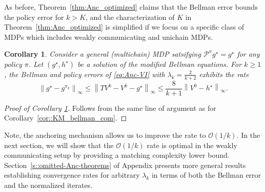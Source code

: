 \documentclass{article} %
\newcommand{\cP}{\mathcal{P}}
\newcommand*{\infn}[1]{\left\|{#1}\right\|_{\infty}}
\newtheorem{corollary}{Corollary}
\begin{document}
As before, Theorem~\ref{thm:Anc_optimized} claims that the Bellman error bounds the policy error for $k>K$, and the characterization of $K$ in Theorem~\ref{thm:Anc_optimized} is simplified if we focus on a specific class of MDPs which includes weakly communicating and unichain MDPs.
\begin{corollary}\label{cor::anc_bellman_com}
Consider a general (multichain) MDP satsifying $\cP^{\pi}g^{\star}=g^{\star}$ for any policy $\pi$.
Let $(g^{\star},h^{\star})$ be a solution of the modified Bellman equations.
For $k\ge 1$, the Bellman and policy errors of \ref{eq:Anc-VI} with $\lambda_{k}=\frac{2}{k+2}$ exhibits the rate
\vspace{-0.05in}
     \[    \infn{g^{\star}-g^{\pi_k}} \le \infn{TV^k-V^k -g^{\star}} \le  \frac{8}{k+1}\infn{V^0-h^{\star}}.\]
\end{corollary}
\begin{proof}[Proof of Corollary \ref{cor::anc_bellman_com}]
Follows from the same line of argument as for Corollary~\ref{cor::KM_bellman_com}.
\end{proof}

Note, the anchoring mechanism allows us to improve the rate to $\mathcal{O}(1/k)$. 
In the next section, we will show that the $\mathcal{O}(1/k)$ rate is optimal in the weakly communicating setup by providing a matching complexity lower bound. 
Section~\ref{s::omitted-Anc-theorems} of Appendix presents more general results establishing convergence rates for arbitrary $\lambda_k$ in terms of both the Bellman error and the normalized iterates.




\end{document}
